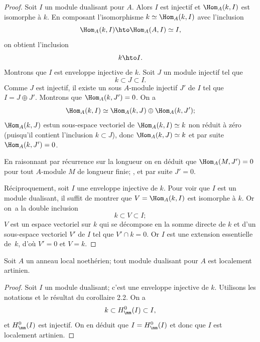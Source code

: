 \begin{proof}
Soit $I$ un module dualisant pour $A$. Alors $I$ est injectif et $\Hom_{A}(k, I)$ est isomorphe \`a $k$. En composant l'isomorphisme $k\simeq \Hom_{A}(k, I)$ avec l'inclusion
$$
\Hom_{A}(k, I)\hto \Hom_{A}(A, I)\simeq I,
$$
on obtient l'inclusion
$$
k\hto I.
$$
Montrons que $I$ est enveloppe injective de $k$. Soit $J$ un module injectif tel que
$$
k\subset J\subset I.
$$
Comme $J$ est injectif, il existe un sous $A$-module injectif $J'$ de $I$ tel que $I=J\oplus J'$. Montrons que $\Hom_{A}(k, J')=0$. On a
$$
\Hom_{A}(k, I)\simeq \Hom_{A}(k, J)\oplus \Hom_{A}(k, J');
$$
$\Hom_{A}(k, J)$ est\pageoriginale un sous-espace vectoriel de $\Hom_{A}(k, I)\simeq k$ non r\'eduit \`a z\'ero (puisqu'il contient l'inclusion $k\subset J$), donc $\Hom_{A}(k, J)\simeq k$ et par suite $\Hom_{A}(k, J')=0$.

En raisonnant par r\'ecurrence sur la longueur on en d\'eduit que $\Hom_{A}(M, J')=0$ pour tout $A$-module $M$ de longueur finie; , et par suite $J'=0$.

R\'eciproquement, soit $I$ une enveloppe injective de $k$. Pour voir que $I$ est un module dualisant, il suffit de montrer  que $V=\Hom_{A}(k, I)$ est isomorphe \`a $k$. Or on~a la double inclusion
$$
k\subset V\subset I;
$$
$V$ est un espace vectoriel sur $k$ qui se d\'ecompose en la somme directe de $k$ et d'un sous-espace vectoriel $V'$ de $I$ tel que $V'\cap k=0$. Or $I$ est une extension essentielle de~$k$, d'o\`u $V'=0$ et $V=k$.
\skipqed
\end{proof}

\begin{corollaire} \label{IV.4.9}
Soit $A$ un anneau local noeth\'erien; tout module dualisant pour $A$ est localement artinien.
\end{corollaire}

\begin{proof}
Soit $I$ un module dualisant; c'est une enveloppe injective de $k$. Utilisons les notations et le r\'esultat du corollaire 2.2. On a
$$
k\subset H^{0}_{\mm}(I)\subset I,
$$
et $H^{0}_{\mm}(I)$ est injectif. On en d\'eduit que $I=H^{0}_{\mm}(I)$ et donc que $I$ est localement artinien.
\skipqed
\end{proof}

